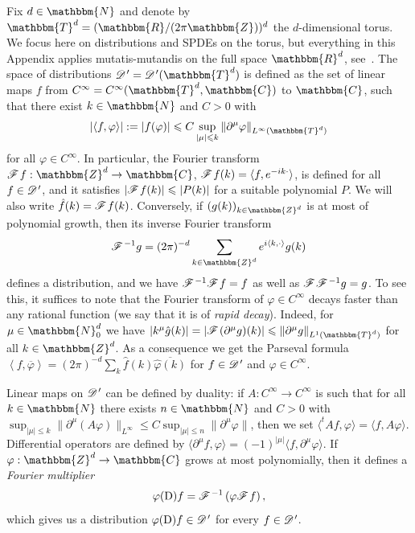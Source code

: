 \documentclass{amsart}
\newcommand{\assign}{:=}
\newcommand{\cdummy}{\cdot}
\newcommand{\mathD}{\mathrm{D}}
\newcommand{\tmtextit}[1]{{\itshape{#1}}}
\theoremstyle{remark}
\theoremstyle{definition}
\newcommand{\CD}{\mathscr{D} \hspace{.1em}}
\newcommand{\CF}{\mathscr{F} \hspace{.1em}}
\begin{document}
Fix $d \in \mathbbm{N}$ and denote by $\mathbbm{T}^d = (\mathbbm{R}/ (2 \pi
\mathbbm{Z}))^d$ the $d$-dimensional torus. We focus here on distributions and
SPDEs on the torus, but everything in this Appendix applies mutatis-mutandis
on the full space $\mathbbm{R}^d$, see~{\cite{gubinelli_paracontrolled_2015}}.
The space of distributions $\CD' = \CD' (\mathbbm{T}^d)$ is defined as the set
of linear maps $f$ from $C^{\infty} = C^{\infty} (\mathbbm{T}^d, \mathbbm{C})$
to $\mathbbm{C}$, such that there exist $k \in \mathbbm{N}$ and $C > 0$ with
\[ | \langle f, \varphi \rangle | \assign | f (\varphi) | \leqslant C \sup_{|
   \mu | \leqslant k} \| \partial^{\mu} \varphi \|_{L^{\infty}
   (\mathbbm{T}^d)} \]
for all $\varphi \in C^{\infty}$. In particular, the Fourier transform $\CF f
: \mathbbm{Z}^d \rightarrow \mathbbm{C}$, $\CF f (k) = \langle f, e^{- i k
\cdummy} \rangle$, is defined for all $f \in \CD'$, and it satisfies $\left|
\CF f (k) \right| \leqslant | P (k) |$ for a suitable polynomial $P$. We will
also write $\hat{f} (k) = \CF f (k)$. Conversely, if $(g (k))_{k \in
\mathbbm{Z}^d}$ is at most of polynomial growth, then its inverse Fourier
transform
\[ \CF^{- 1} g = (2 \pi)^{- d} \sum_{k \in \mathbbm{Z}^d} e^{i \langle k,
   \cdummy \rangle} g (k) \]
defines a distribution, and we have $\CF^{- 1} \CF f = f$ as well as $\CF
\CF^{- 1} g = g$. To see this, it suffices to note that the Fourier transform
of $\varphi \in C^{\infty}$ decays faster than any rational function (we say
that it is of \tmtextit{rapid decay}). Indeed, for $\mu \in \mathbbm{N}^d_0$
we have $| k^{\mu} \hat{g} (k) | = \left| \CF (\partial^{\mu} g) (k) \right|
\leqslant \| \partial^{\mu} g \|_{L^1 (\mathbbm{T}^d)}$ for all $k \in
\mathbbm{Z}^d$. As a consequence we get the Parseval formula $\left\langle f,
\overline{\varphi} \right\rangle = (2 \pi)^{- d} \sum_k \hat{f} (k)
\overline{\hat{\varphi} (k)}$ for $f \in \CD'$ and $\varphi \in C^{\infty}$.

Linear maps on $\CD'$ can be defined by duality: if $A : C^{\infty}
\rightarrow C^{\infty}$ is such that for all $k \in \mathbbm{N}$ there exists
$n \in \mathbbm{N}$ and $C > 0$ with $\sup_{| \mu | \leqslant k} \|
\partial^{\mu} (A \varphi) \|_{L^{\infty}} \leqslant C \sup_{| \mu | \leqslant
n} \| \partial^{\mu} \varphi \|$, then we set $\langle^t A f, \varphi \rangle
= \langle f, A \varphi \rangle$. Differential operators are defined by
$\langle \partial^{\mu} f, \varphi \rangle = (- 1)^{| \mu |} \langle f,
\partial^{\mu} \varphi \rangle$. If $\varphi : \mathbbm{Z}^d \rightarrow
\mathbbm{C}$ grows at most polynomially, then it defines a \tmtextit{Fourier
multiplier}
\[ \varphi (\mathD) f = \CF^{- 1} \left( \varphi \CF f \right), \]
which gives us a distribution $\varphi (\mathD) f \in \CD'$ for every $f \in
\CD'$.
\end{document}
